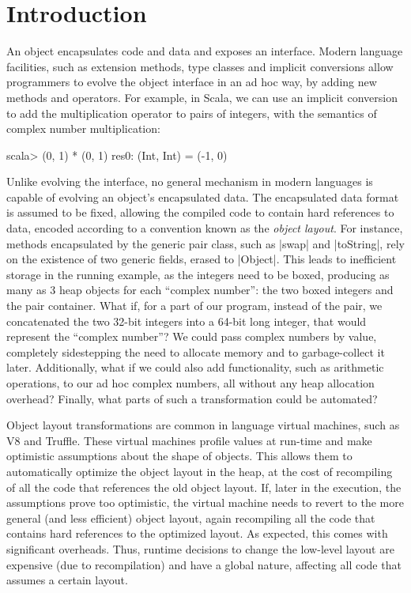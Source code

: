 \section{Introduction}
\label{sec:intro}

An object encapsulates code and data and exposes an interface. Modern
language facilities, such as extension methods, type classes and
implicit conversions allow programmers to evolve the object interface
in an ad hoc way, by adding new methods and operators. For example, in
Scala, we can use an implicit conversion to add the multiplication
operator to pairs of integers, with the semantics of complex number
multiplication:

\begin{lstlisting-nobreak}
scala> (0, 1) * (0, 1)
res0: (Int, Int) = (-1, 0)
\end{lstlisting-nobreak}

Unlike evolving the interface, no general mechanism in modern
languages is capable of evolving an object's encapsulated data. The
encapsulated data format is assumed to be fixed, allowing the compiled
code to contain hard references to data, encoded according to a convention known as the
\emph{object layout}. For instance, methods encapsulated
by the generic pair class, such as |swap| and |toString|, rely on the
existence of two generic fields, erased to |Object|. This leads to
inefficient storage in the running example, as the integers need to be boxed, producing as many as
3 heap objects for each ``complex number'': the two boxed integers and
the pair container. What if, for a part of  our program, instead of the pair, we
concatenated the two 32-bit integers into a 64-bit long integer, that
would represent the ``complex number''? We could pass complex numbers by value,
completely sidestepping the need to allocate memory and to garbage-collect it
later. Additionally, what if we could also add
functionality, such as arithmetic operations, to our ad hoc complex
numbers, all without any heap allocation overhead? Finally, what parts of such a
transformation could be automated? %

Object layout transformations are common in 
language virtual
machines, such as V8 and Truffle. These virtual machines profile
values at run-time and make optimistic assumptions about the shape of
objects. This allows them to automatically optimize the object layout
in the heap, at the cost of recompiling of all the code that references
 the old object layout.
If, later in the execution, the assumptions prove too optimistic, the
virtual machine needs to revert to the more general (and less
efficient) object layout, again recompiling all the code that contains
hard references to the optimized layout. As expected, this comes with
significant overheads. Thus, runtime decisions to change the
low-level layout are expensive (due to recompilation) and
have a global nature, affecting all code that assumes a certain layout.

